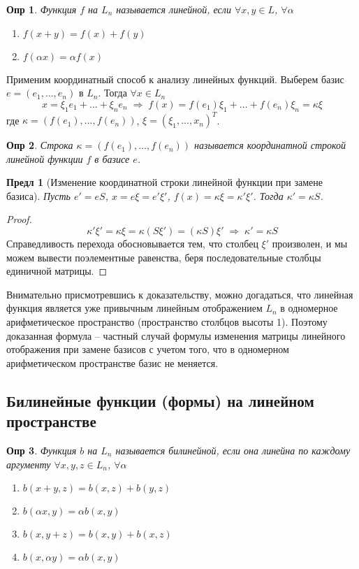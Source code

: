 \documentclass[a4paper,12pt]{article}
\newtheorem*{definition}{Опр}
\newtheorem{propos}{Предл}[section]
\begin{document}
\begin{definition}
	Функция $f$ на $L_n$ называется линейной, если $\forall x,y \in L$, $\forall \alpha$
	\begin{enumerate}
		\item $f(x+y) = f(x) + f(y)$
		\item $f(\alpha x) =\alpha f(x)$
	\end{enumerate}
\end{definition}

Применим координатный способ к анализу линейных функций. Выберем базис $e = (e_1, \ldots, e_n)$ в $L_n$. Тогда $\forall x \in L_n$
\[
	x = \xi_1 e_1 + \ldots + \xi_n e_n \; \Rightarrow \; f(x) =  f(e_1) \xi_1 + \ldots +  f(e_n) \xi_n = \kappa \xi
\]
где $\kappa = (f(e_1), \ldots, f(e_n))$, $\xi = (\xi_1, \ldots, x_n)^T$.

\begin{definition}
	Строка $\kappa = (f(e_1), \ldots, f(e_n))$ называется координатной строкой линейной функции $f$ в базисе $e$.
\end{definition}

\begin{propos}[Изменение координатной строки линейной функции при замене базиса] 
    Пусть $e' = eS$, $x = e \xi = e' \xi'$, $f(x) = \kappa \xi = \kappa' \xi'$. Тогда $\kappa' = \kappa S$. 
\end{propos}
\begin{proof}
	\[
		\kappa' \xi' = \kappa \xi = \kappa (S \xi') = (\kappa S) \xi' \; \Rightarrow \; \kappa' = \kappa S
	\]
	Справедливость перехода обосновывается тем, что столбец $\xi'$ произволен, и мы можем вывести поэлементные равенства, беря последовательные столбцы единичной матрицы.
\end{proof}

Внимательно присмотревшись к доказательству, можно догадаться, что линейная функция является уже привычным линейным отображением $L_n$ в одномерное арифметическое пространство (пространство столбцов высоты 1). Поэтому доказанная формула -- частный случай формулы изменения матрицы линейного отображения при замене базисов с учетом того, что в одномерном арифметическом пространстве базис не меняется.

\subsection{Билинейные функции (формы) на линейном пространстве}

\begin{definition}
	Функция $b$ на $L_n$ называется билинейной, если она линейна по каждому аргументу $\forall x, y, z \in L_n$, $\forall \alpha$	
	\begin{enumerate}
		\item $b(x+y, z) = b(x,z) + b(y,z)$
		\item $b(\alpha x, y) =\alpha b(x, y)$
		\item $b(x,y+ z) = b(x,y) + b(x,z)$
		\item $b(x, \alpha y) =\alpha b(x, y)$
	\end{enumerate}
\end{definition}
\end{document}
